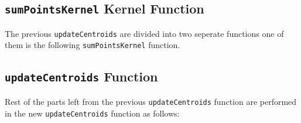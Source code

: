 \subsection{\texttt{sumPointsKernel} Kernel Function}
The previous \texttt{updateCentroids} are divided into two seperate functions one of them is the following \texttt{sumPointsKernel} function.


\subsection{\texttt{updateCentroids} Function}
Rest of the parts left from the previous \texttt{updateCentroids} function are performed in the new \texttt{updateCentroids} function as follows:

